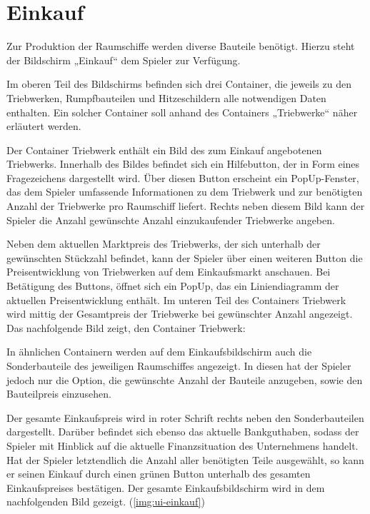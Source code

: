 \section{Einkauf}
\label{sec:ui-einkauf}

Zur Produktion der Raumschiffe werden diverse Bauteile benötigt. Hierzu steht der Bildschirm „Einkauf“ dem Spieler zur Verfügung.
 
Im oberen Teil des Bildschirms befinden sich drei Container, die jeweils zu den Triebwerken, Rumpfbauteilen und Hitzeschildern alle notwendigen Daten enthalten. Ein solcher Container soll anhand des Containers „Triebwerke“ näher erläutert werden. 
 
Der Container Triebwerk enthält ein Bild des zum Einkauf angebotenen Triebwerks. Innerhalb des Bildes befindet sich ein Hilfebutton, der in Form eines Fragezeichens dargestellt wird. Über diesen Button erscheint ein PopUp-Fenster, das dem Spieler umfassende Informationen zu dem Triebwerk und zur benötigten Anzahl der Triebwerke pro Raumschiff liefert. Rechts neben diesem Bild kann der Spieler die Anzahl gewünschte Anzahl einzukaufender Triebwerke angeben.
 
Neben dem aktuellen Marktpreis des  Triebwerks, der sich unterhalb der gewünschten Stückzahl befindet, kann der Spieler über einen weiteren Button die Preisentwicklung von Triebwerken auf dem Einkaufsmarkt anschauen. Bei Betätigung des Buttons, öffnet sich ein PopUp, das ein Liniendiagramm der aktuellen Preisentwicklung enthält. Im unteren Teil des Containers Triebwerk wird mittig der Gesamtpreis der Triebwerke bei gewünschter Anzahl angezeigt.  Das nachfolgende Bild zeigt, den Container Triebwerk:
 
 
In ähnlichen Containern werden auf dem Einkaufsbildschirm auch die Sonderbauteile des jeweiligen Raumschiffes angezeigt. In diesen hat der Spieler jedoch nur die Option, die gewünschte Anzahl der Bauteile anzugeben, sowie den Bauteilpreis einzusehen.
 
Der gesamte Einkaufspreis wird in roter Schrift rechts neben den Sonderbauteilen dargestellt. Darüber befindet sich ebenso das aktuelle Bankguthaben, sodass der Spieler mit Hinblick auf die aktuelle Finanzsituation des Unternehmens handelt. Hat der Spieler letztendlich die Anzahl aller benötigten Teile ausgewählt, so kann er seinen Einkauf durch einen grünen Button unterhalb des gesamten Einkaufspreises bestätigen. Der gesamte Einkaufsbildschirm wird in dem nachfolgenden Bild gezeigt. (\ref{img:ui-einkauf})


